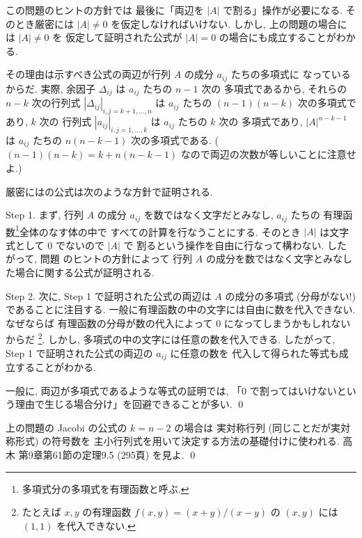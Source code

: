 \documentclass[12pt,twoside]{jarticle}
\begin{document}
\begin{rem}
  この問題のヒントの方針では
  最後に「両辺を $|A|$ で割る」操作が必要になる. そのとき厳密には $|A|\ne 0$ 
  を仮定しなければいけない. しかし, 上の問題の場合には $|A|\ne 0$ を
  仮定して証明された公式が $|A|=0$ の場合にも成立することがわかる.  

  その理由は示すべき公式の両辺が行列 $A$ の成分 $a_{ij}$ たちの多項式に
  なっているからだ.  実際, 余因子 $\Delta_{ij}$ は $a_{ij}$ たちの $n-1$ 次の
  多項式であるから, それらの $n-k$ 次の行列式 $|\Delta_{ij}|_{i,j=k+1,\ldots,n}$ 
  は $a_{ij}$ たちの $(n-1)(n-k)$ 次の多項式であり, $k$ 次の
  行列式 $|a_{ij}|_{i,j=1,\ldots,k}$ は $a_{ij}$ たちの $k$ 次の
  多項式であり,  $|A|^{n-k-1}$ は $a_{ij}$ たちの $n(n-k-1)$ 次の多項式である.
  ($(n-1)(n-k)=k+n(n-k-1)$ なので両辺の次数が等しいことに注意せよ.)

  厳密にはの公式は次のような方針で証明される. 

  Step 1. 
  まず, 行列 $A$ の成分 $a_{ij}$ を数ではなく文字だとみなし, $a_{ij}$ たちの
  有理函数\footnote{多項式分の多項式を有理函数と呼ぶ.}全体のなす体の中で
  すべての計算を行なうことにする. 
  そのとき $|A|$ は文字式として $0$ でないので $|A|$ で
  割るという操作を自由に行なって構わない.  
  したがって, 問題  のヒントの方針によって
  行列 $A$ の成分を数ではなく文字とみなした場合に関する公式が証明される.

  Step 2.
  次に, Step 1 で証明された公式の両辺は $A$ の成分の多項式 (分母がない!) 
  であることに注目する.  
  一般に有理函数の中の文字には自由に数を代入できない. なぜならば
  有理函数の分母が数の代入によって $0$ になってしまうかもしれないからだ%
  \footnote{たとえば $x,y$ の有理函数 $f(x,y)=(x+y)/(x-y)$ の $(x,y)$ 
    には $(1,1)$ を代入できない.}.  
  しかし, 多項式の中の文字には任意の数を代入できる.
  したがって, Step 1 で証明された公式の両辺の $a_{ij}$ に任意の数を
  代入して得られた等式も成立することがわかる.

  一般に, 両辺が多項式であるような等式の証明では, 
  「$0$ で割ってはいけないという理由で生じる場合分け」を回避できることが多い.
  \qed
\end{rem}

\begin{guide}
  上の問題の Jacobi の公式の $k=n-2$ の場合は
  実対称行列 (同じことだが実対称形式) の符号数を
  主小行列式を用いて決定する方法の基礎付けに使われる.
  高木 \cite{takagi1} 第9章第61節の定理9.5 (295頁) を見よ.
  \qed
\end{guide}
\end{document}
